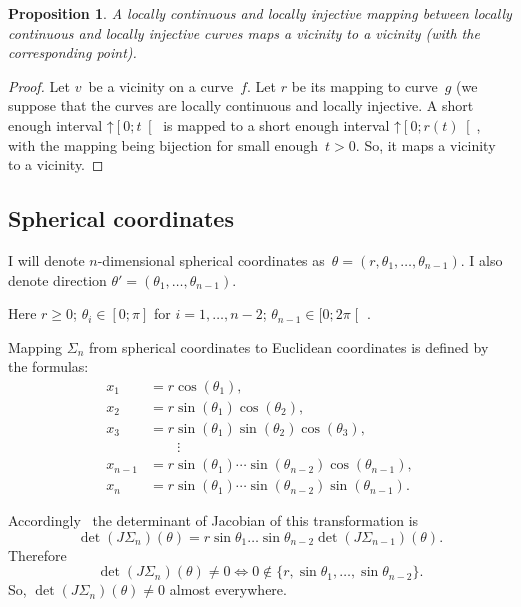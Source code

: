 \documentclass[oneside,draft]{amsart}
\newtheorem{prop}{Proposition}
\begin{document}
\begin{prop}
A locally continuous and locally injective mapping between locally continuous and locally injective curves maps a vicinity to a vicinity (with the corresponding point).
\end{prop}

\begin{proof}
Let $v$~be a vicinity on a curve~$f$. Let $r$ be its mapping to curve~$g$ (we suppose that the curves are locally continuous and locally injective. A short enough interval $\mathord{\uparrow}\left[0;t\right[$ is mapped to a short enough interval $\mathord{\uparrow}\left[0;r(t)\right[$, with the mapping being bijection for small enough~$t>0$. So, it maps a vicinity to a vicinity.
\end{proof}

\subsection{Spherical coordinates}

I will denote $n$-dimensional spherical coordinates as~$\theta=(r, \theta_1,\dots,\theta_{n-1})$.
I also denote direction $\theta'=(\theta_1,\dots,\theta_{n-1})$.

Here $r\geq 0$; $\theta_i\in[0;\pi]$ for $i=1,\dots,n-2$; $\theta_{n-1}\in[0;2\pi\mathclose[$ .

Mapping $\Sigma_n$ from spherical coordinates to Euclidean coordinates is defined by the formulas:
\[
\begin{aligned}x_{1}&=r\cos(\theta _{1}),\\x_{2}&=r\sin(\theta _{1})\cos(\theta _{2}),\\x_{3}&=r\sin(\theta _{1})\sin(\theta _{2})\cos(\theta _{3}),\\&\qquad \vdots \\x_{n-1}&=r\sin(\theta _{1})\cdots \sin(\theta _{n-2})\cos(\theta _{n-1}),\\x_{n}&=r\sin(\theta _{1})\cdots \sin(\theta _{n-2})\sin(\theta _{n-1}).\end{aligned}
\]

Accordingly~\cite{polar-jacobian} the determinant of Jacobian of this transformation is
\[ \det (J\Sigma_n)(\theta) = r\sin\theta_1\dots\sin\theta_{n-2}\det (J\Sigma_{n-1})(\theta). \]
Therefore
\[
\det (J\Sigma_n)(\theta)\ne 0\Leftrightarrow 0\notin\{r,\sin\theta_1,\dots,\sin\theta_{n-2}\}.
\]
So, $\det (J\Sigma_n)(\theta)\ne 0$ almost everywhere.
\end{document}
